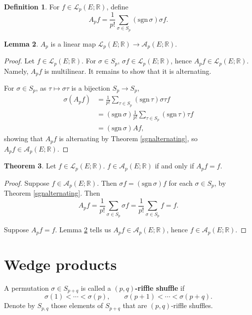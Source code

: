 \documentclass{article}
\newcommand{\sgn}{\mathrm{sgn}\,}
\theoremstyle{definition}
\newtheorem{theorem}{Theorem}
\newtheorem{lemma}[theorem]{Lemma}
\theoremstyle{definition}
\newtheorem{definition}[theorem]{Definition}
\begin{document}
\begin{definition}
For $f \in \mathscr{L}_p(E;\mathbb{R})$, define
\[
A_p f = \frac{1}{p!} \sum_{\sigma \in S_p} (\sgn \sigma) \sigma f.
\]
\end{definition}

\begin{lemma}
$A_p$ is a linear map $\mathscr{L}_p(E;\mathbb{R}) \to \mathscr{A}_p(E;\mathbb{R})$.
\label{Aplemma}
\end{lemma}
\begin{proof}
Let $f \in \mathscr{L}_p(E;\mathbb{R})$.  For $\sigma \in S_p$, $\sigma f \in \mathscr{L}_p(E;\mathbb{R})$, hence
$A_p f \in \mathscr{L}_p(E;\mathbb{R})$. Namely, $A_pf$ is multilinear. It remains to show that it is alternating.


For $\sigma \in S_p$, as $\tau \mapsto \sigma \tau$ is a bijection $S_p \to S_p$,
\begin{align*}
\sigma (A_pf) &=  \frac{1}{p!}\sum_{\tau \in S_p} (\sgn \tau) \sigma \tau f\\
&=(\sgn \sigma)  \frac{1}{p!} \sum_{\tau \in S_p} (\sgn \tau) \tau f\\
&=(\sgn \sigma) Af,
\end{align*}
showing that $A_pf$ is alternating by Theorem \ref{sgnalternating}, so $A_pf \in \mathscr{A}_p(E;\mathbb{R})$. 
\end{proof}


\begin{theorem}
Let $f \in \mathscr{L}_p(E;\mathbb{R})$. $f \in \mathscr{A}_p(E;\mathbb{R})$ if and only if $A_pf=f$.
\label{Aproj}
\end{theorem}
\begin{proof}
Suppose $f \in  \mathscr{A}_p(E;\mathbb{R})$. Then $\sigma f  = (\sgn \sigma) f$ for each $\sigma \in S_p$, by Theorem \ref{sgnalternating}.
Then
\[
A_p f = \frac{1}{p!} \sum_{\sigma \in S_p} \sigma f = \frac{1}{p!} \sum_{\sigma \in S_p} f = f.
\]

Suppose $A_pf =f$. Lemma \ref{Aplemma} tells us $A_pf \in \mathscr{A}_p(E;\mathbb{R})$, hence $f \in \mathscr{A}_p(E;\mathbb{R})$.
\end{proof}



\section{Wedge products}
A permutation $\sigma \in S_{p+q}$ is called a \textbf{$(p,q)$-riffle shuffle} if 
\[
\sigma(1)<\cdots<\sigma(p),\qquad \sigma(p+1)<\cdots<\sigma(p+q).
\]
Denote by $S_{p,q}$ those elements of $S_{p+q}$ that are $(p,q)$-riffle shuffles.
\end{document}
